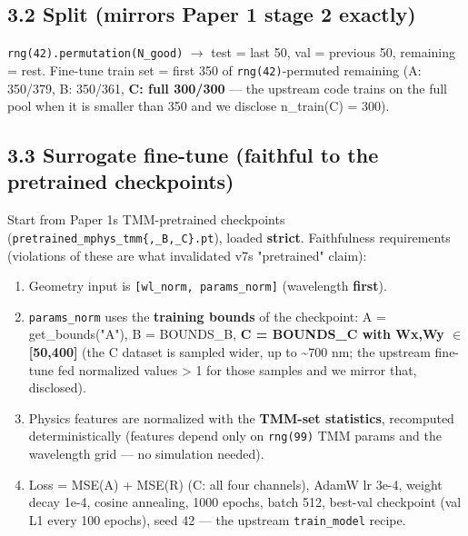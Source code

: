 \documentclass[11pt,a4paper]{article}
\providecommand{\tightlist}{\setlength{\itemsep}{0pt}\setlength{\parskip}{0pt}}
\begin{document}
\subsection*{3.2 Split (mirrors Paper 1 stage 2 exactly)}

\texttt{rng(42).\allowbreak{}permutation(N\_\allowbreak{}good)} \ensuremath{\rightarrow} test = last 50, val = previous 50,
remaining = rest. Fine-tune train set = first 350 of \texttt{rng(42)}-permuted
remaining (A: 350/379, B: 350/361, \textbf{C: full 300/300} --- the upstream code
trains on the full pool when it is smaller than 350 and we disclose
n\_train(C) = 300).

\subsection*{3.3 Surrogate fine-tune (faithful to the pretrained checkpoints)}

Start from Paper 1\textquotesingle s TMM-pretrained checkpoints
(\texttt{pretrained\_\allowbreak{}mphys\_\allowbreak{}tmm\{,\allowbreak{}\_\allowbreak{}B,\allowbreak{}\_\allowbreak{}C\}.\allowbreak{}pt}), loaded \textbf{strict}. Faithfulness
requirements (violations of these are what invalidated v7\textquotesingle s "pretrained"
claim):

\begin{enumerate}
\def\labelenumi{\arabic{enumi}.}
\tightlist
\item
  Geometry input is \texttt{{[}wl\_norm,\ params\_norm{]}} (wavelength \textbf{first}).
\item
  \texttt{params\_norm} uses the \textbf{training bounds} of the checkpoint:
  A = get\_bounds("A"), B = BOUNDS\_B, \textbf{C = BOUNDS\_C with Wx,Wy \ensuremath{\in} {[}50,400{]}}
  (the C dataset is sampled wider, up to \textasciitilde700 nm; the upstream fine-tune fed
  normalized values \textgreater{} 1 for those samples and we mirror that, disclosed).
\item
  Physics features are normalized with the \textbf{TMM-set statistics}, recomputed
  deterministically (features depend only on \texttt{rng(99)} TMM params and the
  wavelength grid --- no simulation needed).
\item
  Loss = MSE(A) + MSE(R) (C: all four channels), AdamW lr 3e-4, weight decay
  1e-4, cosine annealing, 1000 epochs, batch 512, best-val checkpoint
  (val L1 every 100 epochs), seed 42 --- the upstream \texttt{train\_model} recipe.
\end{enumerate}
\end{document}
